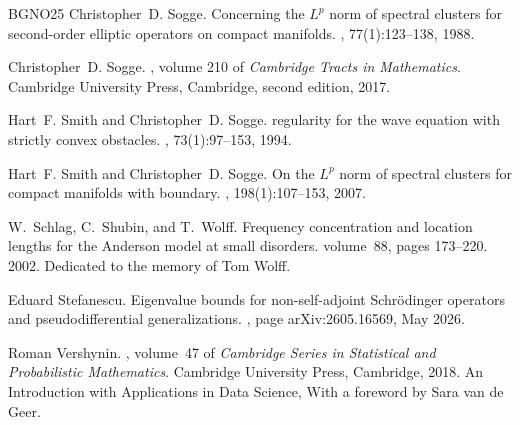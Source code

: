\documentclass[12pt,reqno]{amsart}
\theoremstyle{definition}
\theoremstyle{remark}
\numberwithin{equation}{section}
\newcommand{\1}{\mathbbm{1}}
\begin{document}
\begin{thebibliography}{BGNO25}
Christopher~D. Sogge.
\newblock Concerning the {$L^p$} norm of spectral clusters for second-order
  elliptic operators on compact manifolds.
, 77(1):123--138, 1988.

Christopher~D. Sogge.
, volume 210 of {\em
  Cambridge Tracts in Mathematics}.
\newblock Cambridge University Press, Cambridge, second edition, 2017.

Hart~F. Smith and Christopher~D. Sogge.
 regularity for the wave equation with strictly convex
  obstacles.
, 73(1):97--153, 1994.

Hart~F. Smith and Christopher~D. Sogge.
\newblock On the {$L^p$} norm of spectral clusters for compact manifolds with
  boundary.
, 198(1):107--153, 2007.

W.~Schlag, C.~Shubin, and T.~Wolff.
\newblock Frequency concentration and location lengths for the {A}nderson model
  at small disorders.
\newblock volume~88, pages 173--220. 2002.
\newblock Dedicated to the memory of Tom Wolff.

Eduard {Stefanescu}.
\newblock Eigenvalue bounds for non-self-adjoint {S}chr{\"o}dinger operators
  and pseudodifferential generalizations.
, page arXiv:2605.16569, May 2026.

Roman Vershynin.
, volume~47 of {\em Cambridge
  Series in Statistical and Probabilistic Mathematics}.
\newblock Cambridge University Press, Cambridge, 2018.
\newblock An Introduction with Applications in Data Science, With a foreword by
  Sara van de Geer.

\end{thebibliography}
\end{document}
